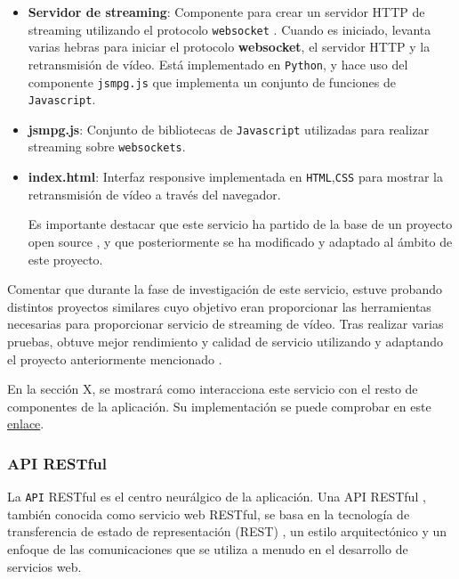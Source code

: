 \begin{itemize}

\item \textbf{Servidor de streaming}: Componente para crear un servidor HTTP de streaming utilizando el protocolo \texttt{websocket} \cite{ref28}. Cuando es iniciado, levanta varias hebras para iniciar el protocolo \textbf{websocket}, el servidor HTTP y la retransmisión de vídeo. Está implementado en \texttt{Python}, y hace uso del componente \texttt{jsmpg.js} que implementa un conjunto de funciones de \texttt{Javascript}.

\item \textbf{jsmpg.js}: Conjunto de bibliotecas de \texttt{Javascript} utilizadas para realizar streaming sobre \texttt{websockets}.

\item \textbf{index.html}: Interfaz responsive implementada en \texttt{HTML},\texttt{CSS} para mostrar la retransmisión de vídeo a través del navegador. 

Es importante destacar que este servicio ha partido de la base de un proyecto open source \cite{ref29}, y que posteriormente se ha modificado y adaptado al ámbito de este proyecto.

\end{itemize}

Comentar que durante la fase de investigación de este servicio, estuve probando distintos proyectos similares cuyo objetivo eran proporcionar las herramientas necesarias para proporcionar servicio de streaming de vídeo. Tras realizar varias pruebas, obtuve mejor rendimiento y calidad de servicio utilizando y adaptando el proyecto anteriormente mencionado \cite{ref29}.

En la sección X, se mostrará como interacciona este servicio con el resto de componentes de la aplicación. Su implementación se puede comprobar en este \href{https://github.com/jmv74211/TFM_security_system_PI/tree/master/src/modules/pistream}{enlace}.

\subsubsection{API RESTful}

La \texttt{API} RESTful es el centro neurálgico de la aplicación. Una API RESTful \cite{ref30}, también conocida como servicio web RESTful, se basa en la tecnología de transferencia de estado de representación (REST) \cite{ref30}, un estilo arquitectónico y un enfoque de las comunicaciones que se utiliza a menudo en el desarrollo de servicios web.

